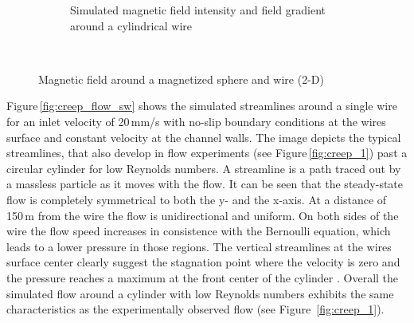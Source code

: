 \begin{figure}[H]
\begin{subfigure}{0.49\textwidth}
                \caption{Simulated magnetic field intensity and field gradient around a cylindrical wire \cite{lindner2013simulation}}\label{fig:mag_field_nirschl}
        \end{subfigure}
        \\
        
        \caption[Magnetic field around a magnetized sphere and wire]{Magnetic field around a magnetized sphere and wire (2-D)}
        \label{fig:esem_prax}
  \end{figure}

 
Figure\,\ref{fig:creep_flow_sw} shows the simulated streamlines around a single wire for an inlet velocity of 20\,mm/s with no-slip boundary conditions at the wires surface and constant velocity at the channel walls. The image depicts the typical streamlines, that also develop in flow experiments (see Figure\,\ref{fig:creep_1}) past a circular cylinder for low Reynolds numbers.  A streamline is a path traced out by a massless particle as it moves with the flow. It can be seen that the steady-state flow is completely symmetrical to both the y- and the x-axis. At a distance of 150\,\textmu m from the wire the flow is unidirectional and uniform. On both sides of the wire the flow speed increases in consistence with the Bernoulli equation, which leads to a lower pressure in those regions. The vertical streamlines at the wires surface center clearly suggest the stagnation point where the velocity is zero and the pressure reaches a maximum at the front center of the cylinder \cite{oertel2001introduction}. Overall the simulated flow around a cylinder with low Reynolds numbers exhibits the same characteristics as the experimentally observed flow (see Figure\, \ref{fig:creep_1}). 
% 
% 
  
